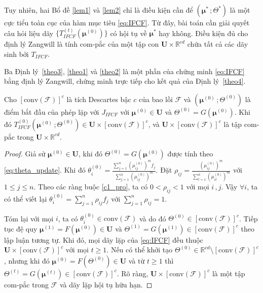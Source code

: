 \documentclass[a4paper,oneside]{book} %
\theoremstyle{plain}
\newcommand{\dly}[1]{\begin{theorem}#1\end{theorem}}
\theoremstyle{plain}
\theoremstyle{nonumberplain}
\newcommand{\chm}[1]{\begin{proof}#1\end{proof}}
\begin{document}
Tuy nhiên, hai Bổ đề \ref{lem1} và \ref{lem2} chỉ là điều kiện cần để $(\bm\mu^*\,;\Theta^*)$ là một cực tiểu toàn cục của hàm mục tiêu \eqref{eq:IFCF}. Từ đây, bài toán cần giải quyết câu hỏi liệu dãy $\{T_{IFCF}^{(t)}(\bm\mu^{(0)})\}$ có hội tụ về $\bm\mu^*$ hay không. Điều kiện đủ cho định lý Zangwill là tính com-pắc của một tập con $\bm U \times \mathbb{R}^{cd}$
chứa tất cả các dãy sinh bởi $T_{IFCF}$. 


Ba Định lý~\ref{theo3}, \ref{theo1} và \ref{theo2} là một phần của chứng minh \eqref{eq:IFCF} bằng định lý Zangwill, chứng minh trực tiếp cho kết quả của Định lý~\ref{theo4}.

\dly{[Ràng buộc com-pắc]\label{theo3}
	Cho $[\mathrm{conv}(\mathcal{F})]^c$ là tích Descartes bậc $c$ của bao lồi $\mathcal{F}$ và $(\bm\mu^{(0)}\,;\Theta^{(0)})$ là điểm bắt đầu của phép lặp với $J_{IFCF}$ với $\bm\mu^{(0)}\in\bm U$ và $\Theta^{(0)} = G(\bm\mu^{(0)})$. Khi đó
	$T^{(0)}_{IFCF}\left(\bm\mu^{(0)}\,;\Theta^{(0)}\right)\in \bm U\times [\mathrm{conv}(\mathcal{F})]^c$,
	và $\bm U\times [\mathrm{conv}(\mathcal{F})]^c$ là tập com-pắc trong $\bm U \times \mathbb{R}^{cd}$. %
}

\chm{
	Giả sử $\bm\mu^{(0)}\in\bm U$, khi đó $\Theta^{(0)} = G(\bm\mu^{(0)})$ được tính theo \eqref{eq:theta_update}. Khi đó $\theta^{(0)}_i = \frac{\sum_{j=1}^n\left(\mu^{(0)}_{ij}\right)^mf_j}{\sum_{j=1}^n\left(\mu^{(0)}_{ij}\right)^m}.$
	Đặt $\rho_{ij} = \frac{\left(\mu^{(0)}_{ij}\right)^m}{\sum_{l=1}^n\left(\mu^{(0)}_{il}\right)^m}$ với $1\le j\le n$. Theo các ràng buộc \eqref{c1_pro}, ta có $0<\rho_{ij}<1$ với mọi $i\,,j$. Vậy $\forall i$, ta có thể viết lại $\theta^{(0)}_i = \sum_{j=1}^n\rho_{ij}f_j$ với $\sum_{j=1}^n\rho_{ij}=1$. 
	
	Tóm lại với mọi $i$, ta có $\theta^{(0)}_i\in \mathrm{conv}(\mathcal{F})$ và do đó $\Theta^{(0)}\in [\mathrm{conv}(\mathcal{F})]^c$. Tiếp tục đệ quy  $\bm\mu^{(1)}=F(\bm\mu^{(0)})\in \bm U$ và $\Theta^{(1)}=G(\bm\mu^{(1)})\in [\mathrm{conv}(\mathcal{F})]^c$ theo lập luận tương tự. Khi đó, mọi dãy lặp của \eqref{eq:IFCF} đều thuộc $\bm U\times [\mathrm{conv}(\mathcal{F})]^c$ với mọi $t\ge1$. Nếu có thể khởi tạo $\Theta^{(0)}\in\mathbb{R}^{cd}\setminus[\mathrm{conv}(\mathcal{F})]^c$, nhưng khi đó $\bm\mu^{(0)} = F(\Theta^{(0)})\in\bm U$ và từ $t\ge1$ thì $\Theta^{(t)} = G(\bm\mu^{(t)}) \in [\mathrm{conv}(\mathcal{F})]^c$. Rõ ràng, $\bm U\times [\mathrm{conv}(\mathcal{F})]^c$ là một tập com-pắc trong $\mathcal{F}$ và dãy lặp hội tụ hữu hạn.
}
\end{document}
